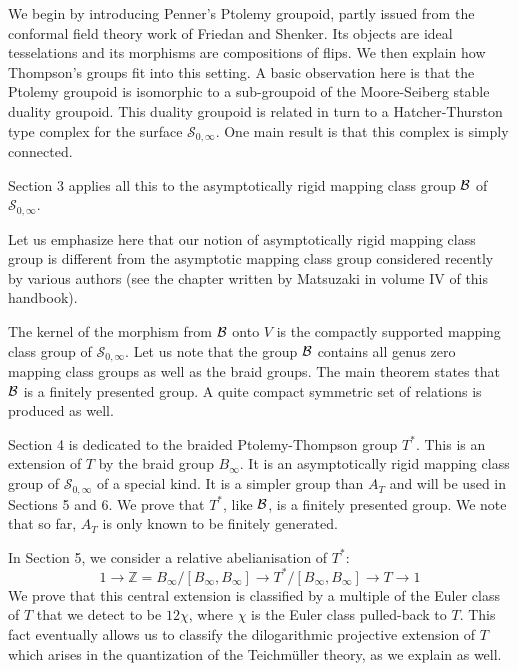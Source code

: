 \documentclass[twoside]{irmaems}
\theoremstyle{plain}
\theoremstyle{definition}
\theoremstyle{remark}
\newcommand{\Z}{{\mathbb{Z}}}
\newcommand{\si}{{\mathscr{S}}_{0,\infty}}
\newcommand{\B}{{{\cal B}}}
\begin{document}
\vspace{0.1cm}\noindent 
We begin by introducing Penner's Ptolemy groupoid, partly issued 
from the conformal field theory  work
of Friedan and Shenker. Its objects are ideal tesselations and 
its morphisms are compositions of flips. 
We then explain how Thompson's groups fit into this setting. 
A basic observation here is that the Ptolemy groupoid is isomorphic to a
sub-groupoid of the Moore-Seiberg stable duality groupoid. 
This duality groupoid is related in turn to a Hatcher-Thurston type 
complex for the surface $\si$. One main
result is that this complex is simply connected.

\vspace{0.1cm}\noindent 
Section 3 applies all this to the asymptotically rigid 
mapping class group $\B$ of $\si$.

\vspace{0.1cm}\noindent 
Let us emphasize here that our notion of asymptotically 
rigid mapping class group
is different from the asymptotic mapping class group considered recently by
various authors (see the chapter written by Matsuzaki in volume IV of this handbook).

\vspace{0.1cm}\noindent 
The kernel of the morphism from $\B$ onto $V$ is the compactly 
supported mapping class group of $\si$.  
Let us note that the group  $\B$  contains all genus zero 
mapping class groups as well as the braid groups. 
The main theorem states that $\B$  is
a finitely presented group. 
A quite compact symmetric set of relations is produced as well.

\vspace{0.1cm}\noindent
Section 4 is dedicated to the braided Ptolemy-Thompson group $T^*$. 
This is an extension of $T$ by the braid group $B_{\infty}$. 
It is an asymptotically rigid mapping class group of
$\si$ of a special kind. It is a simpler group than $A_T$ and 
will be used in Sections 5 and 6.
We prove that $T^*$, like $\B$, is a finitely presented group. 
We note that so far, $A_T$ is only known to be finitely generated.

\vspace{0.1cm}\noindent
In Section 5, we consider a relative abelianisation of $T^*$:
\[
1\to \Z=B_{\infty}/[B_{\infty}, B_{\infty}]\to T^*/[B_{\infty}, B_{\infty}]\to T\to 1
\]
We prove that this central extension is classified by a multiple of the
Euler class of $T$ that we detect to be $12\chi$, where $\chi$ 
is the Euler class pulled-back to $T$.
This fact eventually allows us to classify the 
dilogarithmic projective extension
of $T$ which arises in the quantization of the 
Teichm\"uller theory, as we explain as well.
\end{document}
